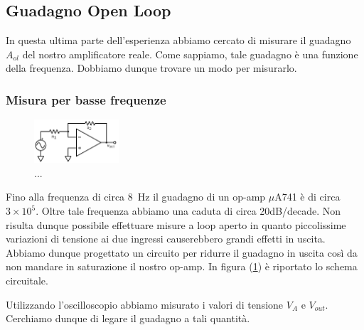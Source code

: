\subsection{Guadagno Open Loop}

In questa ultima parte dell'esperienza abbiamo cercato di misurare il guadagno $A_{ol}$ del nostro amplificatore reale. Come sappiamo, tale guadagno è una funzione della frequenza. Dobbiamo dunque trovare un modo per misurarlo.

\subsubsection{Misura per basse frequenze}

\begin{figure}
  \begin{center}
    \includegraphics[width=0.280\textwidth]{../E03/latex/HF_ol.pdf}
  \end{center}
  \caption{...}
  \label{cir3:low_frequency}
\end{figure}


Fino alla frequenza di circa \SI{8}{\hertz} il guadagno di un op-amp $\mu$A741 è di circa $3\times 10^5$. Oltre tale frequenza abbiamo una caduta di circa 20dB/decade. Non risulta dunque possibile effettuare misure a loop aperto in quanto piccolissime variazioni di tensione ai due ingressi causerebbero grandi effetti in uscita. Abbiamo dunque progettato un circuito per ridurre il guadagno in uscita così da non mandare in saturazione il nostro op-amp. In figura (\ref{cir3:low_frequency}) è riportato lo schema circuitale.  

Utilizzando l'oscilloscopio abbiamo misurato i valori di tensione $V_A$ e $V_{out}$. Cerchiamo dunque di legare il guadagno a tali quantità.



